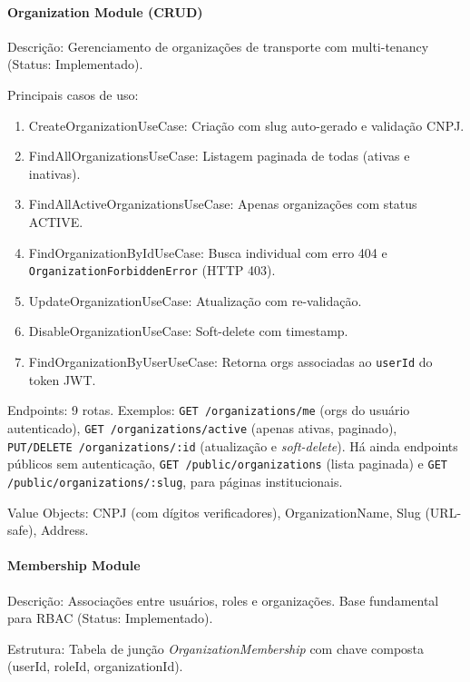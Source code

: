\paragraph{Organization Module (CRUD)}

Descrição: Gerenciamento de organizações de transporte com multi-tenancy (Status: Implementado).

Principais casos de uso:
\begin{enumerate}
\item CreateOrganizationUseCase: Criação com slug auto-gerado e validação CNPJ.
\item FindAllOrganizationsUseCase: Listagem paginada de todas (ativas e inativas).
\item FindAllActiveOrganizationsUseCase: Apenas organizações com status ACTIVE.
\item FindOrganizationByIdUseCase: Busca individual com erro 404 e \texttt{OrganizationForbiddenError} (HTTP 403).
\item UpdateOrganizationUseCase: Atualização com re-validação.
\item DisableOrganizationUseCase: Soft-delete com timestamp.
\item FindOrganizationByUserUseCase: Retorna orgs associadas ao \texttt{userId} do token JWT.
\end{enumerate}

Endpoints: 9 rotas. Exemplos: \texttt{GET /organizations/me} (orgs do usuário autenticado), \texttt{GET /organizations/active} (apenas ativas, paginado), \texttt{PUT/DELETE /organizations/:id} (atualização e \textit{soft-delete}). Há ainda endpoints públicos sem autenticação, \texttt{GET /public/organizations} (lista paginada) e \texttt{GET /public/organizations/:slug}, para páginas institucionais.

Value Objects: CNPJ (com dígitos verificadores), OrganizationName, Slug (URL-safe), Address.

\paragraph{Membership Module}

Descrição: Associações entre usuários, roles e organizações. Base fundamental para RBAC (Status: Implementado).

Estrutura: Tabela de junção \textit{OrganizationMembership} com chave composta (userId, roleId, organizationId).

